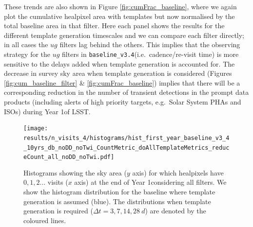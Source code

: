 \documentclass[preprint,linenumbers]{aastex631}
\newcommand{\baseline}{\texttt{baseline\_v3.4}\xspace}
\begin{document}
{		These trends are also shown in Figure \ref{fig:cumFrac_baseline}, where we again plot the cumulative healpixel area with templates  but now normalised by the total baseline area in that filter.
		Here each panel shows the results for the different template generation timescales and we can compare each filter directly; in all cases the $ug$ filters lag behind the others.
		This implies that the observing strategy for the $ug$ filters in \baseline (i.e.\ cadence/re-visit time) is more sensitive to the delays added when template generation is accounted for.
		The decrease in survey sky area when template generation is considered (Figures \ref{fig:cum_baseline_filter} \& \ref{fig:cumFrac_baseline}) implies that there will be a corresponding reduction in the number of transient detections in the prompt data products (including alerts of high priority targets, e.g.\ Solar System PHAs and ISOs) during Year 1of LSST. 
		\\
		
		
		
		\begin{figure}
			\centering
			
			\texttt{[image: results/n\_visits\_4/histograms/hist\_first\_year\_baseline\_v3\_4\_10yrs\_db\_noDD\_noTwi\_CountMetric\_doAllTemplateMetrics\_reduceCount\_all\_noDD\_noTwi.pdf]}
			
			\caption{
				Histograms showing the sky area ($y$ axis) for which healpixels have $0, 1, 2...$ visits ($x$ axis) at the end of Year 1considering all filters.
				We show the histogram distribution for the baseline where template generation is assumed (blue).
				The distributions when template generation is required ($\Delta t = 3, 7, 14, 28\ \si{d}$) are denoted by the coloured lines.
			}
			\label{fig:template_baseline_all}
		\end{figure}
		
}
\end{document}
